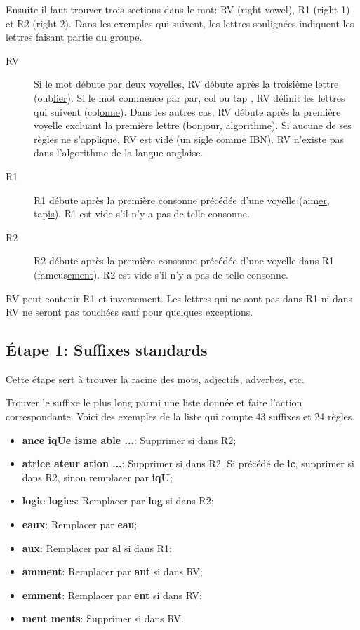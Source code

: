 Ensuite il faut trouver trois sections dans le mot: RV (right vowel), R1 (right 1) et R2 (right 2).
Dans les exemples qui suivent, les lettres soulignées indiquent les lettres faisant partie du groupe.

\begin{description}
  \item[RV]
  
  Si le mot débute par deux voyelles, RV débute après la troisième lettre (oub\underline{lier}).
  Si le mot commence par \og par, col ou tap \fg{}, RV définit les lettres qui suivent (col\underline{onne}).
  Dans les autres cas, RV débute après la première voyelle excluant la première lettre (bo\underline{njour}, algo\underline{rithme}).
  Si aucune de ses règles ne s'applique, RV est vide (un sigle comme IBN).
  RV n'existe pas dans l'algorithme de la langue anglaise.
  
  \item[R1]
  
  R1 débute après la première consonne précédée d'une voyelle (aim\underline{er}, tap\underline{is}).
  R1 est vide s'il n'y a pas de telle consonne.
  
  \item[R2]
  
  R2 débute après la première consonne précédée d'une voyelle dans R1 (fameus\underline{ement}).
  R2 est vide s'il n'y a pas de telle consonne.
\end{description}

RV peut contenir R1 et inversement.
Les lettres qui ne sont pas dans R1 ni dans RV ne seront pas touchées sauf pour quelques exceptions.

\subsection*{Étape 1: Suffixes standards}

Cette étape sert à trouver la racine des mots, adjectifs, adverbes, etc.

Trouver le suffixe le plus long parmi une liste donnée et faire l'action correspondante.
Voici des exemples de la liste qui compte 43 suffixes et 24 règles.

\begin{itemize}
  \item \textbf{ance iqUe isme able ...}: Supprimer si dans R2;
  \item \textbf{atrice ateur ation ...}: Supprimer si dans R2. Si précédé de \textbf{ic}, supprimer si dans R2, sinon remplacer par \textbf{iqU};
  \item \textbf{logie logies}: Remplacer par \textbf{log} si dans R2;
  \item \textbf{eaux}: Remplacer par \textbf{eau};
  \item \textbf{aux}: Remplacer par \textbf{al} si dans R1;
  \item \textbf{amment}: Remplacer par \textbf{ant} si dans RV;
  \item \textbf{emment}: Remplacer par \textbf{ent} si dans RV;
  \item \textbf{ment ments}: Supprimer si dans RV.
\end{itemize}

